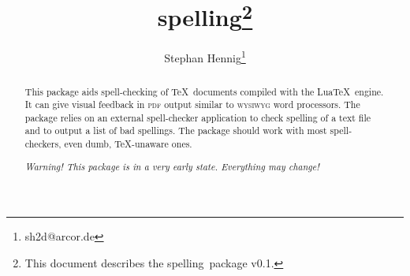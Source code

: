 \documentclass[11pt]{article}
\newcommand*{\pkg}{\textsf{spelling}}
\newcommand*{\acr}[1]{\mbox{\scshape#1}}
\begin{document}
\author{Stephan Hennig\thanks{sh2d@arcor.de}}
\title{\pkg\thanks{This document describes the \pkg\ package v0.1.}}
\maketitle


\begin{abstract}
  This package aids spell-checking of \TeX\ documents compiled with the
  Lua\TeX\ engine.  It can give visual feedback in \acr{pdf} output
  similar to \acr{wysiwyg} word processors.  The package relies on an
  external spell-checker application to check spelling of a text file
  and to output a list of bad spellings.  The package should work with
  most spell-checkers, even dumb, \TeX-unaware ones.

  \emph{Warning!  This package is in a very early state.  Everything may
    change!}
\end{abstract}


\begin{multicols}{2}
\small
\tableofcontents
\end{multicols}
\end{document}

